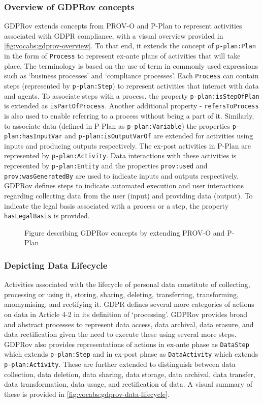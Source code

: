 \subsubsection{Overview of GDPRov concepts}
GDPRov extends concepts from PROV-O and P-Plan to represent activities associated with GDPR compliance, with a visual overview provided in \autoref{fig:vocabs:gdprov-overview}.
To that end, it extends the concept of \texttt{p-plan:Plan} in the form of \texttt{Process} to represent ex-ante plans of activities that will take place. The terminology is based on the use of term in commonly used expressions such as `business processes' and `compliance processes'.
Each \texttt{Process} can contain steps (represented by \texttt{p-plan:Step}) to represent activities that interact with data and agents.
To associate steps with a process, the property \texttt{p-plan:isStepOfPlan} is extended as \texttt{isPartOfProcess}.
Another additional property - \texttt{refersToProcess} is also used to enable referring to a process without being a part of it.
Similarly, to associate data (defined in P-Plan as \texttt{p-plan:Variable}) the properties \texttt{p-plan:hasInputVar} and \texttt{p-plan:isOutputVarOf} are extended for activities using inputs and producing outputs respectively.
The ex-post activities in P-Plan are represented by \texttt{p-plan:Activity}.
Data interactions with these activities is represented by \texttt{p-plan:Entity} and the properties \texttt{prov:used} and \texttt{prov:wasGeneratedBy} are used to indicate inputs and outputs respectively.
GDPRov defines steps to indicate automated execution and user interactions regarding collecting data from the user (input) and providing data (output).
To indicate the legal basis associated with a process or a step, the property \texttt{hasLegalBasis} is provided.
\begin{figure}[htbp]
    \centering
    \missingfigure[figcolor=white]{}
    \caption{Figure describing GDPRov concepts by extending PROV-O and P-Plan}
    \label{fig:vocabs:gdprov-overview}
\end{figure}

\subsubsection{Depicting Data Lifecycle}
Activities associated with the lifecycle of personal data constitute of collecting, processing or using it, storing, sharing, deleting, transferring, transforming, anomymising, and rectifying it. GDPR defines several more categories of actions on data in Article 4-2 in its definition of `processing'.
GDPRov provides broad and abstract processes to represent data access, data archival, data erasure, and data rectification given the need to execute these using several more steps.
GDPRov also provides representations of actions in ex-ante phase as \texttt{DataStep} which extends \texttt{p-plan:Step} and in ex-post phase as \texttt{DataActivity} which extends \texttt{p-plan:Activity}.
These are further extended to distinguish between data collection, data deletion, data sharing, data storage, data archival, data transfer, data transformation, data usage, and rectification of data.
A visual summary of these is provided in \autoref{fig:vocabs:gdprov-data-lifecycle}.

